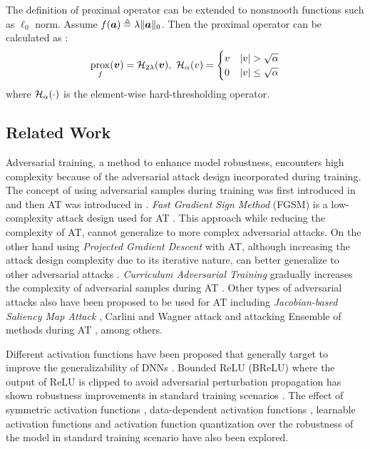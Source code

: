 \documentclass[conference]{IEEEtran}
\begin{document}
The definition of proximal operator can be extended to nonsmooth functions such as $\ell_0$ norm. Assume $f(\boldsymbol{a})\triangleq \lambda\Vert \boldsymbol{a}\Vert_0$. Then the proximal operator can be calculated as \cite{sare10}:
\begin{align}
    \mathop{\mathrm{prox}}_f(\boldsymbol{v}) = \mathcal{H}_{2\lambda}(\boldsymbol{v}),~ \mathcal{H}_{\alpha}(v) = 
    \begin{cases}
        v & \vert v \vert > \sqrt{\alpha}\\
        0 & \vert v \vert \leq \sqrt{\alpha}
    \end{cases}
\end{align}
where $\mathcal{H}_{\alpha}(\cdot)$ is the element-wise hard-thresholding operator.

\subsection{Related Work}\label{sec:relwk}

Adversarial training, a method to enhance model robustness, encounters high complexity because of the adversarial attack design incorporated during training. The concept of using adversarial samples during training was first introduced in \cite{iposz13} and then AT was introduced in \cite{tdlmm18}. \emph{Fast Gradient Sign Method} (FGSM) is a low-complexity attack design used for AT \cite{eattk18, usslk21, fibwr19, rfsvb20}. This approach while reducing the complexity of AT, cannot generalize to more complex adversarial attacks. On the other hand using \emph{Projected Gradient Descent} with AT, although increasing the attack design complexity due to its iterative nature, can better generalize to other adversarial attacks \cite{tdlmm18, eattk18, otcwm19, ccacl22}. \emph{Curriculum Adversarial Training} gradually increases the complexity of adversarial samples during AT \cite{catcl18}. Other types of adversarial attacks also have been proposed to be used for AT including \emph{Jacobian-based Saliency Map Attack} \cite{oitqh19}, Carlini and Wagner attack \cite{tetcw17, ddcwh18} and attacking Ensemble of methods during AT \cite{iarpx19}, among others.


Different activation functions have been proposed that generally target to improve the generalizability of DNNs \cite{dsrgb11, faacu15, sfarz17, ddihz15, snnlf24, rafll21, swleu18, gelhg18}. Bounded ReLU (BReLU) where the output of ReLU is clipped to avoid adversarial perturbation propagation has shown robustness improvements in standard training scenarios \cite{edazn17}. The effect of symmetric activation functions \cite{stuzg16}, data-dependent activation functions \cite{advwl20}, learnable activation functions \cite{slata21} and activation function quantization \cite{ddnry18} over the robustness of the model in standard training scenario have also been explored. 
\end{document}
